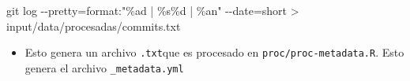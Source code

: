 \documentclass[
  spanish,
  letterpaper,
  DIV=11,
  numbers=noendperiod]{scrreprt}
\newenvironment{Shaded}{\begin{snugshade}}{\end{snugshade}}
\newcommand{\AttributeTok}[1]{\textcolor[rgb]{0.40,0.45,0.13}{#1}}
\newcommand{\FunctionTok}[1]{\textcolor[rgb]{0.28,0.35,0.67}{#1}}
\newcommand{\NormalTok}[1]{\textcolor[rgb]{0.00,0.23,0.31}{#1}}
\newcommand{\OperatorTok}[1]{\textcolor[rgb]{0.37,0.37,0.37}{#1}}
\newcommand{\StringTok}[1]{\textcolor[rgb]{0.13,0.47,0.30}{#1}}
\providecommand{\tightlist}{%
  \setlength{\itemsep}{0pt}\setlength{\parskip}{0pt}}
\begin{document}
\begin{Shaded}
\begin{Highlighting}[]
\FunctionTok{git}\NormalTok{ log }\AttributeTok{{-}{-}pretty}\OperatorTok{=}\NormalTok{format:}\StringTok{"\%ad | \%s\%d | \%an"} \AttributeTok{{-}{-}date}\OperatorTok{=}\NormalTok{short }\OperatorTok{\textgreater{}}\NormalTok{ input/data/procesadas/commits.txt}
\end{Highlighting}
\end{Shaded}

\begin{itemize}
\tightlist
\item
  Esto genera un archivo \texttt{.txt}que es procesado en
  \texttt{proc/proc-metadata.R}. Esto genera el archivo
  \texttt{\_metadata.yml}
\end{itemize}
\end{document}
